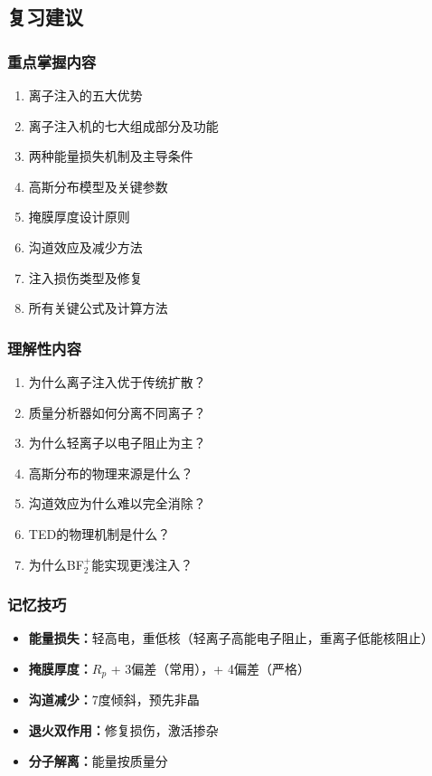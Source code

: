 \documentclass[UTF8,12pt,a4paper]{ctexart}
\begin{document}
\subsection{复习建议}

\subsubsection{重点掌握内容}

\begin{enumerate}
    \item 离子注入的五大优势
    \item 离子注入机的七大组成部分及功能
    \item 两种能量损失机制及主导条件
    \item 高斯分布模型及关键参数
    \item 掩膜厚度设计原则
    \item 沟道效应及减少方法
    \item 注入损伤类型及修复
    \item 所有关键公式及计算方法
\end{enumerate}

\subsubsection{理解性内容}

\begin{enumerate}
    \item 为什么离子注入优于传统扩散？
    \item 质量分析器如何分离不同离子？
    \item 为什么轻离子以电子阻止为主？
    \item 高斯分布的物理来源是什么？
    \item 沟道效应为什么难以完全消除？
    \item TED的物理机制是什么？
    \item 为什么BF$_2^+$能实现更浅注入？
\end{enumerate}

\subsubsection{记忆技巧}

\begin{itemize}
    \item \textbf{能量损失：}轻高电，重低核（轻离子高能电子阻止，重离子低能核阻止）
    \item \textbf{掩膜厚度：}$R_p$ + 3偏差（常用），+ 4偏差（严格）
    \item \textbf{沟道减少：}7度倾斜，预先非晶
    \item \textbf{退火双作用：}修复损伤，激活掺杂
    \item \textbf{分子解离：}能量按质量分
\end{itemize}
\end{document}
